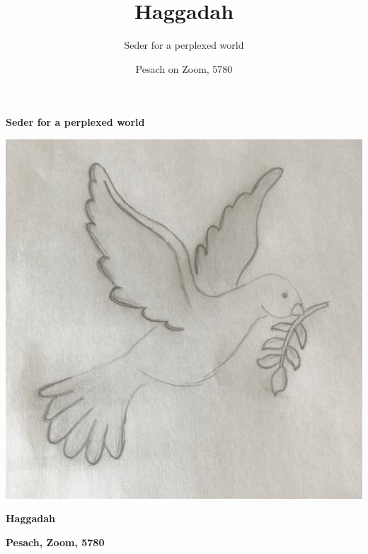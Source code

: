\documentclass[extrafontsizes,twoside,17pt,a4paper,openany]{memoir}
\title{\vspace*{-4cm}Haggadah}
\author{\vspace*{-1cm}Seder for a perplexed world}
\date{Pesach on Zoom, 5780}
\begin{document}
\frontmatter
{}
\afterpage{\restorepagecolor}



\thispagestyle{empty}
\pagestyle{plain}

\begin{center}

\vfill
{  \Huge \textcolor{oats}{\bfseries Seder for a perplexed world}}

\end{center}

\medskip

                       \noindent\hspace*{5mm}
\includegraphics[width=160mm,trim=8mm 10mm 5mm 15mm,clip]{figs/amy-dove.jpg}
\thispagestyle{empty}

\medskip

\begin{center}
{\HUGE \textcolor{jonipink}{\bfseries Haggadah }}

\bigskip

{\Large \textcolor{oats}{\bfseries Pesach, Zoom, 5780 }}
\end{center}
\end{document}
